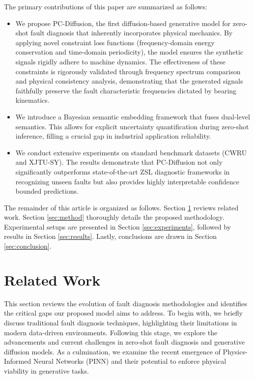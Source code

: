 \documentclass[journal]{IEEEtran}
\begin{document}
The primary contributions of this paper are summarized as follows:
\begin{itemize}
    \item We propose PC-Diffusion, the first diffusion-based generative model for zero-shot fault diagnosis that inherently incorporates physical mechanics. By applying novel constraint loss functions (frequency-domain energy conservation and time-domain periodicity), the model ensures the synthetic signals rigidly adhere to machine dynamics. The effectiveness of these constraints is rigorously validated through frequency spectrum comparison and physical consistency analysis, demonstrating that the generated signals faithfully preserve the fault characteristic frequencies dictated by bearing kinematics.
    \item We introduce a Bayesian semantic embedding framework that fuses dual-level semantics. This allows for explicit uncertainty quantification during zero-shot inference, filling a crucial gap in industrial application reliability.
    \item We conduct extensive experiments on standard benchmark datasets (CWRU and XJTU-SY). The results demonstrate that PC-Diffusion not only significantly outperforms state-of-the-art ZSL diagnostic frameworks in recognizing unseen faults but also provides highly interpretable confidence bounded predictions.
\end{itemize}

The remainder of this article is organized as follows. Section \ref{sec:related} reviews related work. Section \ref{sec:method} thoroughly details the proposed methodology. Experimental setups are presented in Section \ref{sec:experiments}, followed by results in Section \ref{sec:results}. Lastly, conclusions are drawn in Section \ref{sec:conclusion}.
\section{Related Work}
\label{sec:related}

This section reviews the evolution of fault diagnosis methodologies and identifies the critical gaps our proposed model aims to address. To begin with, we briefly discuss traditional fault diagnosis techniques, highlighting their limitations in modern data-driven environments. Following this stage, we explore the advancements and current challenges in zero-shot fault diagnosis and generative diffusion models. As a culmination, we examine the recent emergence of Physics-Informed Neural Networks (PINN) and their potential to enforce physical viability in generative tasks.
\end{document}
